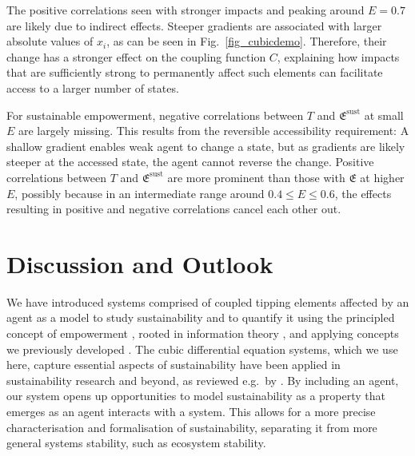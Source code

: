 \documentclass[conference]{IEEEtran}
\newcommand{\empowerment}{\ensuremath{\mathfrak{E}}}
\newcommand{\sustainableempowerment}{\ensuremath{\empowerment^{\mathrm{sust}}}}
\newcommand{\couplingfunction}{\ensuremath{C}}
\newcommand{\sumderivsquares}{\ensuremath{T}}
\newcommand{\impactstrength}{\ensuremath{E}}
\begin{document}
The positive correlations seen with stronger impacts and peaking
around $\impactstrength = 0.7$ are likely due to indirect effects. Steeper gradients
are associated with larger absolute values of $x_i$, as can be seen in
Fig.~\ref{fig_cubicdemo}. Therefore, their change has a stronger
effect on the coupling function $\couplingfunction$, explaining how
impacts that are sufficiently strong to permanently affect such
elements can facilitate access to a larger number of states.

For sustainable empowerment, negative correlations between
$\sumderivsquares$ and $\sustainableempowerment$ at small $\impactstrength$ are
largely missing. This results from the reversible accessibility
requirement: A shallow gradient enables weak agent to change a state,
but as gradients are likely steeper at the accessed state, the agent
cannot reverse the change. Positive correlations between
$\sumderivsquares$ and $\sustainableempowerment$ are more prominent
than those with $\empowerment$ at higher $\impactstrength$, possibly because in an
intermediate range around $0.4 \le \impactstrength \le 0.6$, the effects resulting
in positive and negative correlations cancel each other out.


\section{Discussion and Outlook}



We have introduced systems comprised of coupled tipping elements
affected by an agent as a model to study sustainability and to
quantify it using the principled concept of empowerment
\cite{Salge2014_empowermentintro}, rooted in information theory
\cite{CoverThomas1991_informationtheory}, and applying concepts we
previously developed \cite{Kim2009_sustainability}. The cubic
differential equation systems, which we use here, capture essential
aspects of sustainability have been applied in sustainability research
and beyond, as reviewed e.g.\ by
\cite{Klose2019_interactingtippingelements}. By including an agent,
our system opens up opportunities to model sustainability as a
property that emerges as an agent interacts with a system. This allows
for a more precise characterisation and formalisation of
sustainability, separating it from more general systems stability,
such as ecosystem stability.
\end{document}
